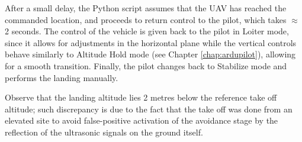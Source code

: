 After a small delay, the Python script assumes that the UAV has reached the commanded location, and proceeds to return control to the pilot, which takes $\approx$2 seconds.
The control of the vehicle is given back to the pilot in Loiter mode, since it allows for adjustments in the horizontal plane while the vertical controls behave similarly to Altitude Hold mode (see Chapter \ref{chap:ardupilot}), allowing for a smooth transition.
Finally, the pilot changes back to Stabilize mode and performs the landing manually.

Observe that the landing altitude lies 2 metres below the reference take off altitude; such discrepancy is due to the fact that the take off was done from an elevated site to avoid false-positive activation of the avoidance stage by the reflection of the ultrasonic signals on the ground itself.

